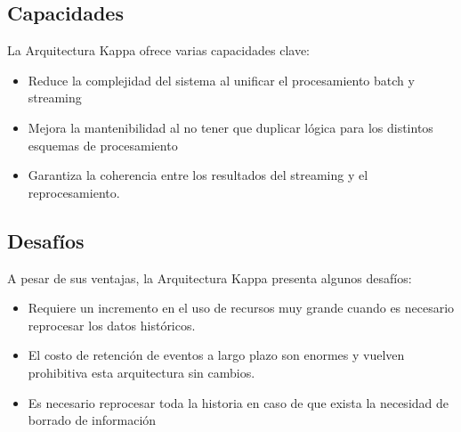 \subsection{Capacidades}
La Arquitectura Kappa ofrece varias capacidades clave:
\begin{itemize}
    \item Reduce la complejidad del sistema al unificar el procesamiento batch y streaming
    \item Mejora la mantenibilidad al no tener que duplicar lógica para los distintos esquemas de procesamiento
    \item Garantiza la coherencia entre los resultados del streaming y el reprocesamiento.
\end{itemize}

\newpage
\subsection{Desafíos}
A pesar de sus ventajas, la Arquitectura Kappa presenta algunos desafíos:
\begin{itemize}
    \item Requiere un incremento en el uso de recursos muy grande cuando es necesario reprocesar los datos históricos.
    \item El costo de retención de eventos a largo plazo son enormes y vuelven prohibitiva esta arquitectura sin cambios.
    \item Es necesario reprocesar toda la historia en caso de que exista la necesidad de borrado de información
\end{itemize}


